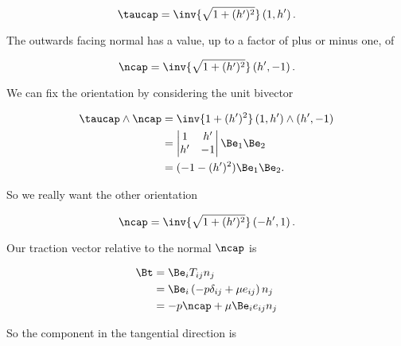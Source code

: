\begin{equation}\label{eqn:inclinedFlowWithoutConstantHeightAssumption:140}
\taucap = \inv{\sqrt{1 + (h')^2}} \left( 1, h' \right).
\end{equation}

The outwards facing normal has a value, up to a factor of plus or minus one, of

\begin{equation}\label{eqn:inclinedFlowWithoutConstantHeightAssumption:160}
\ncap = 
\inv{\sqrt{1 + (h')^2}} \left( h', -1 \right).
\end{equation}

We can fix the orientation by considering the unit bivector

\begin{align*}
\taucap \wedge \ncap &= 
\inv{1 + (h')^2} 
\left( 1, h' \right) 
\wedge
\left( h', -1 \right) \\
&=
\begin{vmatrix}
1 & h' \\
h' & -1
\end{vmatrix}
\Be_1 \Be_2 \\
&=
( -1 - (h')^2 )
\Be_1 \Be_2.
\end{align*}

So we really want the other orientation

\begin{equation}\label{eqn:inclinedFlowWithoutConstantHeightAssumption:180}
\ncap = \inv{\sqrt{1 + (h')^2}} \left( -h', 1 \right).
\end{equation}

Our traction vector relative to the normal $\ncap$ is

\begin{align*}
\Bt 
&= \Be_i T_{ij} n_j \\
&= 
\Be_i \left( -p \delta_{ij}
+ \mu e_{ij}
\right) n_j \\
&=
-p \ncap + \mu \Be_i e_{ij} n_j
\end{align*}

So the component in the tangential direction is

